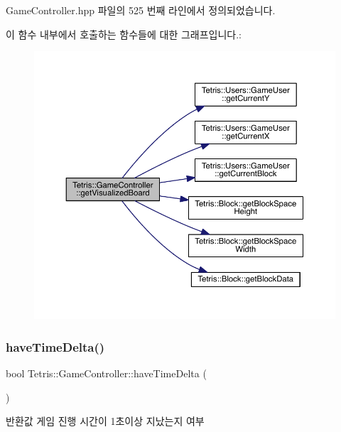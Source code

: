 Game\+Controller.\+hpp 파일의 525 번째 라인에서 정의되었습니다.

이 함수 내부에서 호출하는 함수들에 대한 그래프입니다.\+:
\nopagebreak
\begin{figure}[H]
\begin{center}
\leavevmode
\includegraphics[width=350pt]{class_tetris_1_1_game_controller_aa0d81626f41c784dc256069293719e5f_cgraph}
\end{center}
\end{figure}
\mbox{\label{class_tetris_1_1_game_controller_a6c0d944a3e90caede9a216cb3537db44}} 
\subsubsection{\texorpdfstring{have\+Time\+Delta()}{haveTimeDelta()}}
{\footnotesize\ttfamily bool Tetris\+::\+Game\+Controller\+::have\+Time\+Delta (\begin{DoxyParamCaption}{ }\end{DoxyParamCaption})\hspace{0.3cm}{\ttfamily [inline]}}

\begin{DoxyReturn}{반환값}
게임 진행 시간이 1초이상 지났는지 여부 
\end{DoxyReturn}


